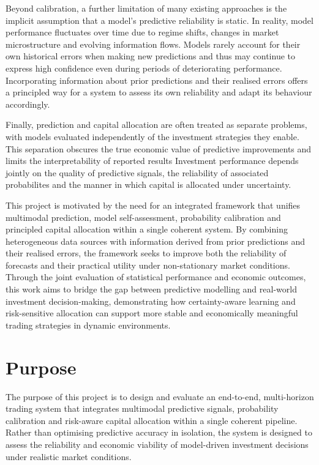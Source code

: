 \documentclass{l4proj}
\begin{document}
Beyond calibration, a further limitation of many existing approaches is the implicit assumption that a model's predictive reliability is static. In reality, model performance fluctuates over time due to regime shifts, changes in market microstructure and evolving information flows. Models rarely account for their own historical errors when making new predictions and thus may continue to express high confidence even during periods of deteriorating performance. Incorporating information about prior predictions and their realised errors offers a principled way for a system to assess its own reliability and adapt its behaviour accordingly.

Finally, prediction and capital allocation are often treated as separate problems, with models evaluated independently of the investment strategies they enable. This separation obscures the true economic value of predictive improvements and limits the interpretability of reported results Investment performance depends jointly on the quality of predictive signals, the reliability of associated probabilites and the manner in which capital is allocated under uncertainty.

This project is motivated by the need for an integrated framework that unifies multimodal prediction, model self-assessment, probability calibration and principled capital allocation within a single coherent system. By combining heterogeneous data sources with information derived from prior predictions and their realised errors, the framework seeks to improve both the reliability of forecasts and their practical utility under non-stationary market conditions. Through the joint evaluation of statistical performance and economic outcomes, this work aims to bridge the gap between predictive modelling and real-world investment decision-making, demonstrating how certainty-aware learning and risk-sensitive allocation can support more stable and economically meaningful trading strategies in dynamic environments.

\section{Purpose}

The purpose of this project is to design and evaluate an end-to-end, multi-horizon trading system that integrates multimodal predictive signals, probability calibration and risk-aware capital allocation within a single coherent pipeline. Rather than optimising predictive accuracy in isolation, the system is designed to assess the reliability and economic viability of model-driven investment decisions under realistic market conditions.
\end{document}
